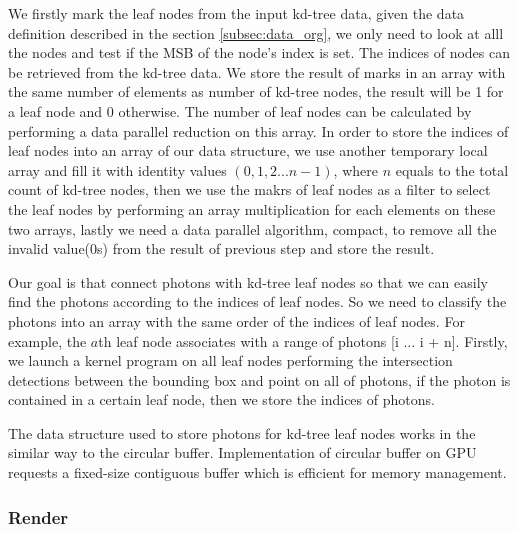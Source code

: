 We firstly mark the leaf nodes from the input kd-tree data, given the data definition described in the section \ref{subsec:data_org}, we only need to look at alll the nodes and test if the MSB of the node's index is set. The indices of nodes can be retrieved from the kd-tree data. We store the result of marks in an array with the same number of elements as number of kd-tree nodes, the result will be 1 for a leaf node and 0 otherwise. The number of leaf nodes can be calculated by performing a data parallel reduction on this array. In order to store the indices of leaf nodes into an array of our data structure, we use another temporary local array and fill it with identity values \( (0, 1, 2 ... n-1) \), where \(n\) equals to the total count of kd-tree nodes, then we use the makrs of leaf nodes as a filter to select the leaf nodes by performing an array multiplication for each elements on these two arrays, lastly we need a data parallel algorithm, compact, to remove all the invalid value(0s) from the result of previous step and store the result. 

Our goal is that connect photons with kd-tree leaf nodes so that we can easily find the photons according to the indices of leaf nodes. So we need to classify the photons into an array with the same order of the indices of leaf nodes. For example, the \(a\)th leaf node associates with a range of photons [i ... i + n]. Firstly, we launch a kernel program on all leaf nodes performing the intersection detections between the bounding box and point on all of photons, if the photon is contained in a certain leaf node, then we store the indices of photons. 

The data structure used to store photons for kd-tree leaf nodes works in the similar way to the circular buffer. Implementation of circular buffer on GPU requests a fixed-size contiguous buffer which is efficient for memory management.  


\subsubsection{Render} 




